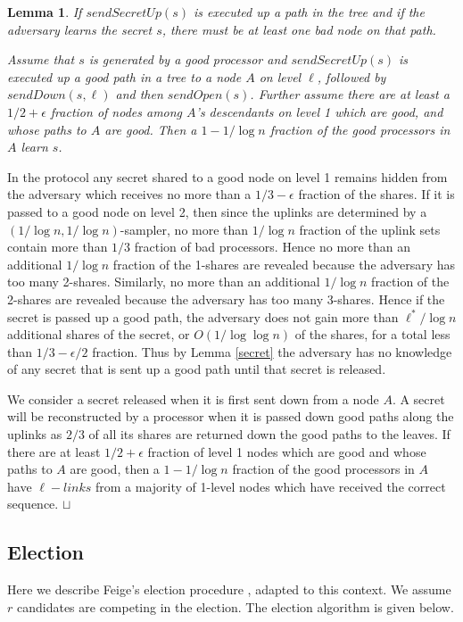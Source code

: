 \documentclass[letterpaper,11pt]{article}
\newtheorem{lemma}{Lemma}
\newcommand{\sq}{\hbox{\rlap{$\sqcap$}$\sqcup$}}
\newcommand{\qed}{\hspace*{\fill}\sq}
\newenvironment{proof}{\noindent {\bf Proof:}}{\qed\par\vskip 4mm\par}
\begin{document}
\begin{lemma}
\enumerate
\item If  $sendSecretUp(s)$ is executed up a path in the tree and if the adversary learns the secret $s$, there must be at least one bad node on that path. 
\item Assume that $s$ is generated by a good processor and $sendSecretUp(s)$ is executed up a good path in a tree to a node $A$ on level $\ell$, followed by $sendDown(s,\ell)$  and then $sendOpen(s)$.  Further assume there are at least a $1/2 + \epsilon $ fraction of nodes among $A$'s descendants on level 1 which are good, and whose paths to $A$ are good.  Then a $ 1-1/\log n$ fraction of the good processors  in $A$ learn $s$.
\end{lemma}

\begin{proof}
In the protocol any secret shared to a good node on level 1 remains hidden from the adversary which receives no more than a $1/3-\epsilon$ fraction of the shares.  If it is passed to a good node on level 2, then since the uplinks are determined by a $(1/\log n, 1/\log n)$-sampler, no more than $1/\log n$ fraction of the uplink sets contain more than $1/3$ fraction of bad processors. Hence   
no more than an additional $1/\log n$ fraction of the 1-shares are revealed because the adversary has too many 2-shares.  Similarly, no more than 
an additional $1/\log n$ fraction of the 2-shares are revealed because the adversary has too many 3-shares. Hence if the secret is passed up a good path,
the adversary does not gain more than $\ell^*/\log n$ additional shares of the secret, or $O(1/\log\log n)$ of the shares, for a total less than $1/3-\epsilon/2$ fraction. Thus by Lemma \ref{secret} the adversary has no knowledge of any secret that is sent up a good path until that secret is released. 


We consider a secret released  when it is first sent down from a node $A$. A secret will be reconstructed  by a processor when it is passed down good paths along the uplinks as  $2/3$ of all its shares are returned down the good paths to the leaves. If there are at least $1/2 +\epsilon$ fraction of level 1 nodes which are good and whose paths to $A$ are good, then a $1-1/\log n$ fraction of the good processors in $A$ have $\ell - links$ from a majority of 1-level nodes which have received the correct sequence. 
\end{proof}



\subsection{Election}\label{election}
Here we describe Feige's election procedure \cite{Feige}, adapted to this context.  We assume $r$ candidates are competing in the election.  The election algorithm is given below.
\end{document}
